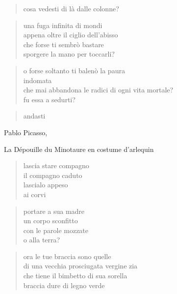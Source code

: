 \clearpage


	\begin{verse}
		cosa vedesti di là dalle colonne?
	\end{verse}

	\begin{verse}
		una fuga infinita di mondi\\
		appena oltre il ciglio dell'abisso\\
		che forse ti sembrò bastare\\
		sporgere la mano per toccarli?
	\end{verse}

	\begin{verse}
		o forse soltanto ti balenò la paura\\
		indomata\\
		che mai abbandona le radici di ogni vita mortale?\\
		fu essa a sedurti?
	\end{verse}

	\begin{verse}
		andasti
	\end{verse}

\clearpage


\begin{artItem}
	Pablo Picasso, \begin{otherlanguage}{french}%
		La Dépouille du Minotaure en costume d’arlequin%
	\end{otherlanguage}
\end{artItem}

	\begin{verse}
		lascia stare compagno\\
		il compagno caduto\\
		lascialo appeso\\
		ai corvi
	\end{verse}

	\begin{verse}
		portare a sua madre\\
		un corpo sconfitto\\
		con le parole mozzate\\
		o alla terra?
	\end{verse}

	\begin{verse}
		ora le tue braccia sono quelle\\
		di una vecchia prosciugata vergine zia\\
		che tiene il bimbetto di sua sorella\\
		braccia dure di legno verde
	\end{verse}

